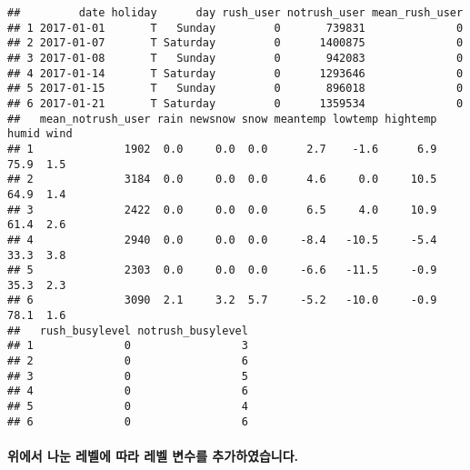 \documentclass[]{article}
\newenvironment{Shaded}{\begin{snugshade}}{\end{snugshade}}
\newcommand{\KeywordTok}[1]{\textcolor[rgb]{0.13,0.29,0.53}{\textbf{#1}}}
\newcommand{\StringTok}[1]{\textcolor[rgb]{0.31,0.60,0.02}{#1}}
\newcommand{\CommentTok}[1]{\textcolor[rgb]{0.56,0.35,0.01}{\textit{#1}}}
\newcommand{\OperatorTok}[1]{\textcolor[rgb]{0.81,0.36,0.00}{\textbf{#1}}}
\newcommand{\NormalTok}[1]{#1}
\let\oldparagraph\paragraph
\renewcommand{\paragraph}[1]{\oldparagraph{#1}\mbox{}}
\begin{document}
\begin{Shaded}
\end{Shaded}

\begin{verbatim}
##         date holiday      day rush_user notrush_user mean_rush_user
## 1 2017-01-01       T   Sunday         0       739831              0
## 2 2017-01-07       T Saturday         0      1400875              0
## 3 2017-01-08       T   Sunday         0       942083              0
## 4 2017-01-14       T Saturday         0      1293646              0
## 5 2017-01-15       T   Sunday         0       896018              0
## 6 2017-01-21       T Saturday         0      1359534              0
##   mean_notrush_user rain newsnow snow meantemp lowtemp hightemp humid wind
## 1              1902  0.0     0.0  0.0      2.7    -1.6      6.9  75.9  1.5
## 2              3184  0.0     0.0  0.0      4.6     0.0     10.5  64.9  1.4
## 3              2422  0.0     0.0  0.0      6.5     4.0     10.9  61.4  2.6
## 4              2940  0.0     0.0  0.0     -8.4   -10.5     -5.4  33.3  3.8
## 5              2303  0.0     0.0  0.0     -6.6   -11.5     -0.9  35.3  2.3
## 6              3090  2.1     3.2  5.7     -5.2   -10.0     -0.9  78.1  1.6
##   rush_busylevel notrush_busylevel
## 1              0                 3
## 2              0                 6
## 3              0                 5
## 4              0                 6
## 5              0                 4
## 6              0                 6
\end{verbatim}

\paragraph{위에서 나눈 레벨에 따라 레벨 변수를
추가하였습니다.}\label{------.}

\begin{Shaded}
\end{Shaded}
\end{document}
